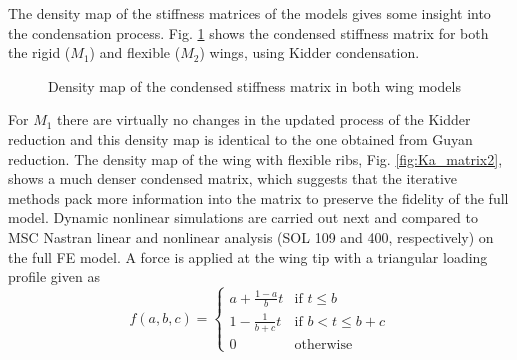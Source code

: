 \documentclass[11pt]{article}
\begin{document}
The density map of the stiffness matrices of the models gives some insight into the condensation process. Fig. \ref{fig:Ka_matrix} shows the condensed stiffness matrix for both the rigid ($M_1$) and flexible ($M_2$) wings, using Kidder condensation. 

\begin{figure}[h!]
\centering
{}
\caption{Density map of the condensed stiffness matrix in both wing models}\label{fig:Ka_matrix}
\end{figure}
For $M_1$ there are virtually no changes in the updated process of the Kidder reduction and this density map is identical to the  one obtained from Guyan reduction. The density map of the wing with flexible ribs, Fig. \ref{fig:Ka_matrix2}, shows a much denser condensed matrix, which suggests that the iterative methods pack more information into the matrix to preserve the fidelity of the full model.
Dynamic nonlinear  simulations are carried out next and compared to MSC Nastran linear and nonlinear analysis (SOL 109 and 400, respectively) on the full FE model. A force is applied at the wing tip with a triangular loading profile given as  
\begin{equation}\label{eq:loading}
  f(a,b,c) =
    \begin{cases}
      a+\frac{1-a}{b}t & \text{if $t \leq b$}\\
     1-\frac{1}{b+c}t & \text{if $b<t \leq b+c$}\\
      0 & \text{otherwise}
    \end{cases}       
\end{equation}
\end{document}
